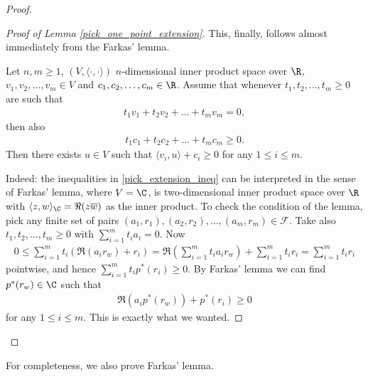 \begin{proof}
\begin{proof}[Proof of Lemma \ref{pick_one_point_extension}]
		This, finally, follows almost immediately from the Farkas' lemma.
		\begin{lem}\label{farkas_lemma}
			Let $n, m \geq 1$, $(V, \langle \cdot, \cdot \rangle)$ $n$-dimensional inner product space over $\R$, $v_{1}, v_{2}, \ldots, v_{m} \in V$ and $c_{1}, c_{2}, \ldots, c_{m} \in \R$. Assume that whenever $t_{1}, t_{2}, \ldots, t_{m} \geq 0$ are such that
			\begin{align*}
				t_{1} v_{1} + t_{2} v_{2} + \ldots + t_{m} v_{m} = 0,
			\end{align*}
			then also
			\begin{align*}
				t_{1} c_{1} + t_{2} c_{2} + \ldots + t_{m} c_{m} \geq 0.
			\end{align*}
			Then there exists $u \in V$ such that $\langle v_{i}, u\rangle + c_{i} \geq 0$ for any $1 \leq i \leq m$.
		\end{lem}
		Indeed: the inequalities in \ref{pick_extension_ineq} can be interpreted in the sense of Farkas' lemma, where $V = \C$, is two-dimensional inner product space over $\R$ with $\langle z, w \rangle_{\C} = \Re(z \overline{w})$ as the inner product. To check the condition of the lemma, pick any finite set of pairs $(a_{1}, r_{1}), (a_{2}, r_{2}), \ldots, (a_{m}, r_{m}) \in \mathcal{F}$. Take also $t_{1}, t_{2}, \ldots, t_{m} \geq 0$ with $\sum_{i = 1}^{m} t_{i} a_{i} = 0$. Now
		\begin{align*}
			0 \leq \sum_{i = 1}^{m} t_{i} \left(\Re(a_{i} r_{w}) + r_{i}\right) = \Re\left(\sum_{i = 1}^{m} t_{i} a_{i} r_{w}\right) + \sum_{i = 1}^{m} t_{i} r_{i} = \sum_{i = 1}^{m} t_{i} r_{i}
		\end{align*}
		pointwise, and hence $\sum_{i = 1}^{m} t_{i} p^{*}(r_{i}) \geq 0$. By Farkas' lemma we can find $p^{*}(r_{w}) \in \C$ such that
		\begin{align*}
			\Re(a_{i} p^{*}(r_{w})) + p^{*}(r_{i}) \geq 0
		\end{align*}
		for any $1 \leq i \leq m$. This is exactly what we wanted.
	\end{proof}
\end{proof}

For completeness, we also prove Farkas' lemma.

